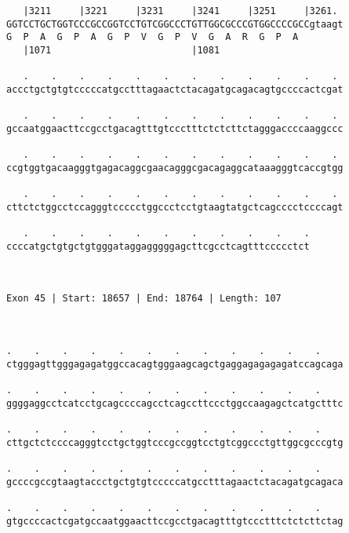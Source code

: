 \documentclass{article}
\begin{document}
\begin{Verbatim}
   |3211     |3221     |3231     |3241     |3251     |3261. 
GGTCCTGCTGGTCCCGCCGGTCCTGTCGGCCCTGTTGGCGCCCGTGGCCCCGCCgtaagt
G  P  A  G  P  A  G  P  V  G  P  V  G  A  R  G  P  A        
   |1071                         |1081                      
  
   .    .    .    .    .    .    .    .    .    .    .    . 
accctgctgtgtcccccatgcctttagaactctacagatgcagacagtgccccactcgat
                                                            
   .    .    .    .    .    .    .    .    .    .    .    . 
gccaatggaacttccgcctgacagtttgtccctttctctcttctagggaccccaaggccc
                                                            
   .    .    .    .    .    .    .    .    .    .    .    . 
ccgtggtgacaagggtgagacaggcgaacagggcgacagaggcataaagggtcaccgtgg
                                                            
   .    .    .    .    .    .    .    .    .    .    .    . 
cttctctggcctccagggtccccctggccctcctgtaagtatgctcagcccctccccagt
                                                            
   .    .    .    .    .    .    .    .    .    .    .
ccccatgctgtgctgtgggataggagggggagcttcgcctcagtttccccctct
                                                      
                                                      
 
Exon 45 | Start: 18657 | End: 18764 | Length: 107



.    .    .    .    .    .    .    .    .    .    .    .    
ctgggagttgggagagatggccacagtgggaagcagctgaggagagagagatccagcaga
                                                            
.    .    .    .    .    .    .    .    .    .    .    .    
ggggaggcctcatcctgcagccccagcctcagccttccctggccaagagctcatgctttc
                                                            
.    .    .    .    .    .    .    .    .    .    .    .    
cttgctctccccagggtcctgctggtcccgccggtcctgtcggccctgttggcgcccgtg
                                                            
.    .    .    .    .    .    .    .    .    .    .    .    
gccccgccgtaagtaccctgctgtgtcccccatgcctttagaactctacagatgcagaca
                                                            
.    .    .    .    .    .    .    .    .    .    .    .    
gtgccccactcgatgccaatggaacttccgcctgacagtttgtccctttctctcttctag
                                                            

\end{Verbatim}
\end{document}
